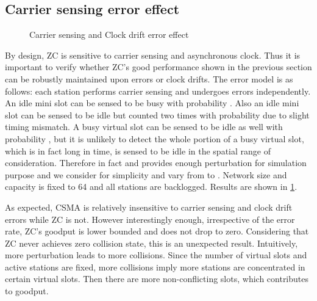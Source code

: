 \documentclass{acm_proc_article-sp}
\begin{document}
\subsection{Carrier sensing error effect}
\begin{figure}[ht]
    \begin{center}
    \caption{Carrier sensing and Clock drift error effect} \label{fig.clockdrift}
    \end{center}
\vspace{-0.2in}
\end{figure}
By design, ZC is sensitive to carrier sensing and asynchronous clock. Thus it is important to verify whether ZC's good performance shown in the previous section can be robustly maintained upon errors or clock drifts. The error model is as follows: each station performs carrier sensing and undergoes errors independently. An idle mini slot can be sensed to be busy with probability . Also an idle mini slot can be sensed to be idle but counted two times with probability  due to slight timing mismatch. A busy virtual slot can be sensed to be idle as well with probability , but it is unlikely to detect the whole portion of a busy virtual slot, which is in fact long in time, is sensed to be idle in the spatial range of consideration. Therefore in fact  and  provides enough perturbation for simulation purpose and we consider  for simplicity and vary  from  to . Network size and capacity is fixed to 64 and all stations are backlogged. Results are shown in \ref{fig.clockdrift}.

As expected, CSMA is relatively insensitive to carrier sensing and clock drift errors while ZC is not.
However interestingly enough, irrespective of the error rate, ZC's goodput is lower bounded and does not drop to zero. Considering that ZC never achieves zero collision state, this is an unexpected result. Intuitively, more perturbation leads to more collisions. Since the number of virtual slots and active stations are fixed, more collisions imply more stations are concentrated in certain virtual slots. Then there are more non-conflicting slots, which contributes to goodput.
\end{document}

